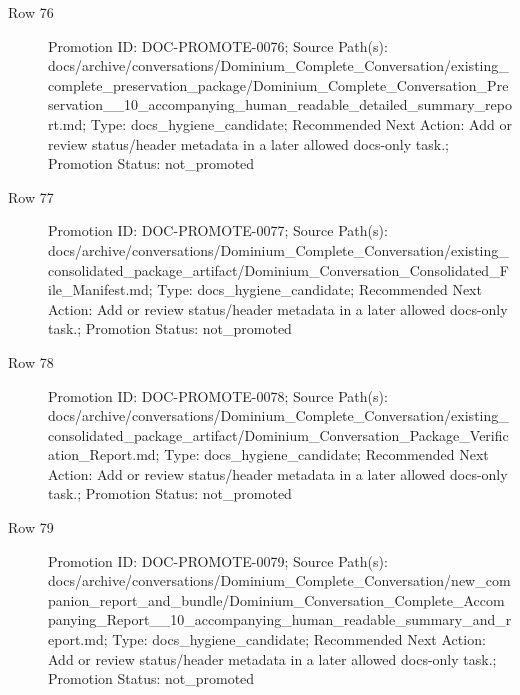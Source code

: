 \documentclass[9pt,a4paper,openany]{book}
\begin{document}
\begin{description}
\item[Row 76] Promotion ID: DOC-\allowbreak{}PROMOTE-\allowbreak{}0076; Source Path(s): docs/\allowbreak{}archive/\allowbreak{}conversations/\allowbreak{}Dominium\_\allowbreak{}Complete\_\allowbreak{}Conversation/\allowbreak{}existing\_\allowbreak{}complete\_\allowbreak{}preservation\_\allowbreak{}package/\allowbreak{}Dominium\_\allowbreak{}Complete\_\allowbreak{}Conversation\_\allowbreak{}Preservation\_\allowbreak{}\_\allowbreak{}10\_\allowbreak{}accompanying\_\allowbreak{}human\_\allowbreak{}readable\_\allowbreak{}detailed\_\allowbreak{}summary\_\allowbreak{}report.\allowbreak{}md; Type: docs\_\allowbreak{}hygiene\_\allowbreak{}candidate; Recommended Next Action: Add or review status/\allowbreak{}header metadata in a later allowed docs-\allowbreak{}only task.\allowbreak{}; Promotion Status: not\_\allowbreak{}promoted
\item[Row 77] Promotion ID: DOC-\allowbreak{}PROMOTE-\allowbreak{}0077; Source Path(s): docs/\allowbreak{}archive/\allowbreak{}conversations/\allowbreak{}Dominium\_\allowbreak{}Complete\_\allowbreak{}Conversation/\allowbreak{}existing\_\allowbreak{}consolidated\_\allowbreak{}package\_\allowbreak{}artifact/\allowbreak{}Dominium\_\allowbreak{}Conversation\_\allowbreak{}Consolidated\_\allowbreak{}File\_\allowbreak{}Manifest.\allowbreak{}md; Type: docs\_\allowbreak{}hygiene\_\allowbreak{}candidate; Recommended Next Action: Add or review status/\allowbreak{}header metadata in a later allowed docs-\allowbreak{}only task.\allowbreak{}; Promotion Status: not\_\allowbreak{}promoted
\item[Row 78] Promotion ID: DOC-\allowbreak{}PROMOTE-\allowbreak{}0078; Source Path(s): docs/\allowbreak{}archive/\allowbreak{}conversations/\allowbreak{}Dominium\_\allowbreak{}Complete\_\allowbreak{}Conversation/\allowbreak{}existing\_\allowbreak{}consolidated\_\allowbreak{}package\_\allowbreak{}artifact/\allowbreak{}Dominium\_\allowbreak{}Conversation\_\allowbreak{}Package\_\allowbreak{}Verification\_\allowbreak{}Report.\allowbreak{}md; Type: docs\_\allowbreak{}hygiene\_\allowbreak{}candidate; Recommended Next Action: Add or review status/\allowbreak{}header metadata in a later allowed docs-\allowbreak{}only task.\allowbreak{}; Promotion Status: not\_\allowbreak{}promoted
\item[Row 79] Promotion ID: DOC-\allowbreak{}PROMOTE-\allowbreak{}0079; Source Path(s): docs/\allowbreak{}archive/\allowbreak{}conversations/\allowbreak{}Dominium\_\allowbreak{}Complete\_\allowbreak{}Conversation/\allowbreak{}new\_\allowbreak{}companion\_\allowbreak{}report\_\allowbreak{}and\_\allowbreak{}bundle/\allowbreak{}Dominium\_\allowbreak{}Conversation\_\allowbreak{}Complete\_\allowbreak{}Accompanying\_\allowbreak{}Report\_\allowbreak{}\_\allowbreak{}10\_\allowbreak{}accompanying\_\allowbreak{}human\_\allowbreak{}readable\_\allowbreak{}summary\_\allowbreak{}and\_\allowbreak{}report.\allowbreak{}md; Type: docs\_\allowbreak{}hygiene\_\allowbreak{}candidate; Recommended Next Action: Add or review status/\allowbreak{}header metadata in a later allowed docs-\allowbreak{}only task.\allowbreak{}; Promotion Status: not\_\allowbreak{}promoted

\end{description}
\end{document}
